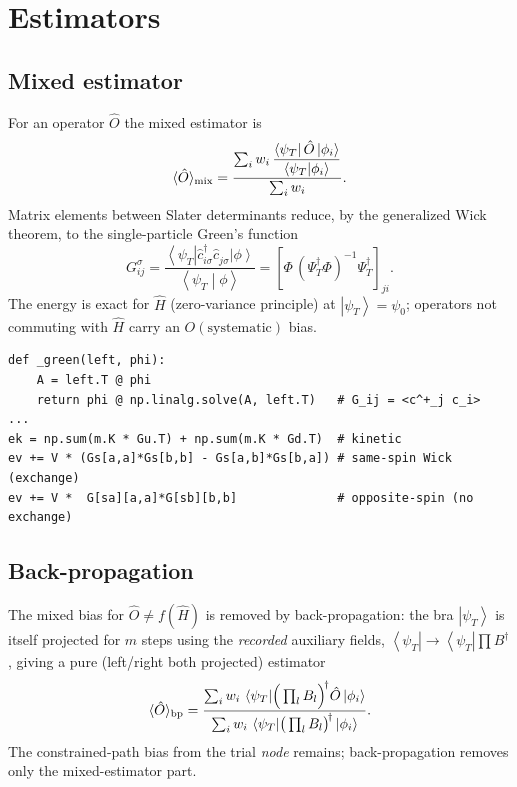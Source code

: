 \documentclass[11pt]{article}
\newcommand{\cre}[1]{\hat{c}^{\dagger}_{#1}}
\newcommand{\ann}[1]{\hat{c}^{\phantom{\dagger}}_{#1}}
\newcommand{\ket}[1]{\left|#1\right\rangle}
\newcommand{\bra}[1]{\left\langle#1\right|}
\newcommand{\bracket}[2]{\left\langle#1\middle|#2\right\rangle}
\newcommand{\psiT}{\ket{\psi_T}}
\begin{document}
\section{Estimators}
\subsection{Mixed estimator}
For an operator $\hat O$ the mixed estimator is
\begin{equation}
\langle \hat O\rangle_{\rm mix}
= \frac{\sum_i w_i\, \dfrac{\bra{\psi_T}\hat O\ket{\phi_i}}{\bracket{\psi_T}{\phi_i}}}
       {\sum_i w_i}.
\label{eq:mixed}
\end{equation}
Matrix elements between Slater determinants reduce, by the generalized Wick
theorem, to the single-particle Green's function
\begin{equation}
G^{\sigma}_{ij}
= \frac{\bra{\psi_T}\cre{i\sigma}\ann{j\sigma}\ket{\phi}}{\bracket{\psi_T}{\phi}}
= \left[\Phi\,(\Psi_T^{\dagger}\Phi)^{-1}\Psi_T^{\dagger}\right]_{ji}.
\label{eq:green}
\end{equation}
The energy is exact for $\hat H$ (zero-variance principle) at $\psiT=\psi_0$;
operators not commuting with $\hat H$ carry an $O(\text{systematic})$ bias.

\begin{lstlisting}[caption={Green's function and mixed energy
(\texttt{Estimators.energy}).}]
def _green(left, phi):
    A = left.T @ phi
    return phi @ np.linalg.solve(A, left.T)   # G_ij = <c^+_j c_i>
...
ek = np.sum(m.K * Gu.T) + np.sum(m.K * Gd.T)  # kinetic
ev += V * (Gs[a,a]*Gs[b,b] - Gs[a,b]*Gs[b,a]) # same-spin Wick (exchange)
ev += V *  G[sa][a,a]*G[sb][b,b]              # opposite-spin (no exchange)
\end{lstlisting}

\subsection{Back-propagation}
The mixed bias for $\hat O\neq f(\hat H)$ is removed by back-propagation: the bra
$\psiT$ is itself projected for $m$ steps using the \emph{recorded} auxiliary
fields, $\bra{\psi_T}\to\bra{\psi_T}\prod B^{\dagger}$, giving a pure (left/right
both projected) estimator
\begin{equation}
\langle\hat O\rangle_{\rm bp}
= \frac{\sum_i w_i\,
\bra{\psi_T}\!\Big(\textstyle\prod_l B_l\Big)^{\!\dagger}\hat O\ket{\phi_i}}
{\sum_i w_i\,\bra{\psi_T}\!\big(\prod_l B_l\big)^{\!\dagger}\ket{\phi_i}} .
\label{eq:bp}
\end{equation}
The constrained-path bias from the trial \emph{node} remains; back-propagation
removes only the mixed-estimator part.
\end{document}
